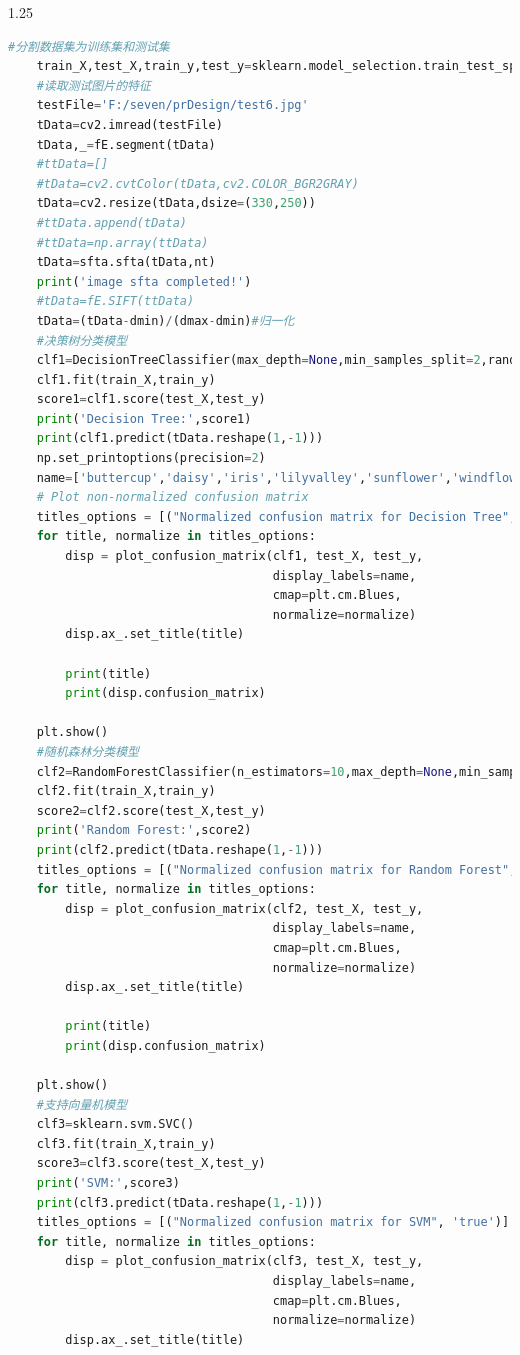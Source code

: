\documentclass[supercite]{HustGraduPaper}
\begin{document}
\begin{sloppypar}
\begin{appendices}
\begin{spacing}{1.25}
\begin{lstlisting}[language=python]
    #分割数据集为训练集和测试集
    train_X,test_X,train_y,test_y=sklearn.model_selection.train_test_split(data,label,test_size=0.5,random_state=42,stratify=label)
    #读取测试图片的特征
    testFile='F:/seven/prDesign/test6.jpg'
    tData=cv2.imread(testFile)
    tData,_=fE.segment(tData)
    #ttData=[]
    #tData=cv2.cvtColor(tData,cv2.COLOR_BGR2GRAY)
    tData=cv2.resize(tData,dsize=(330,250))
    #ttData.append(tData)
    #ttData=np.array(ttData)
    tData=sfta.sfta(tData,nt)
    print('image sfta completed!')
    #tData=fE.SIFT(ttData)
    tData=(tData-dmin)/(dmax-dmin)#归一化
    #决策树分类模型
    clf1=DecisionTreeClassifier(max_depth=None,min_samples_split=2,random_state=0)
    clf1.fit(train_X,train_y)
    score1=clf1.score(test_X,test_y)
    print('Decision Tree:',score1)
    print(clf1.predict(tData.reshape(1,-1)))
    np.set_printoptions(precision=2)
    name=['buttercup','daisy','iris','lilyvalley','sunflower','windflower']
    # Plot non-normalized confusion matrix
    titles_options = [("Normalized confusion matrix for Decision Tree", 'true')]
    for title, normalize in titles_options:
        disp = plot_confusion_matrix(clf1, test_X, test_y,
                                     display_labels=name,
                                     cmap=plt.cm.Blues,
                                     normalize=normalize)
        disp.ax_.set_title(title)
    
        print(title)
        print(disp.confusion_matrix)
    
    plt.show()
    #随机森林分类模型
    clf2=RandomForestClassifier(n_estimators=10,max_depth=None,min_samples_split=2,random_state=0)
    clf2.fit(train_X,train_y)
    score2=clf2.score(test_X,test_y)
    print('Random Forest:',score2)
    print(clf2.predict(tData.reshape(1,-1)))
    titles_options = [("Normalized confusion matrix for Random Forest", 'true')]
    for title, normalize in titles_options:
        disp = plot_confusion_matrix(clf2, test_X, test_y,
                                     display_labels=name,
                                     cmap=plt.cm.Blues,
                                     normalize=normalize)
        disp.ax_.set_title(title)
    
        print(title)
        print(disp.confusion_matrix)
    
    plt.show()
    #支持向量机模型
    clf3=sklearn.svm.SVC()
    clf3.fit(train_X,train_y)
    score3=clf3.score(test_X,test_y)
    print('SVM:',score3)
    print(clf3.predict(tData.reshape(1,-1)))
    titles_options = [("Normalized confusion matrix for SVM", 'true')]
    for title, normalize in titles_options:
        disp = plot_confusion_matrix(clf3, test_X, test_y,
                                     display_labels=name,
                                     cmap=plt.cm.Blues,
                                     normalize=normalize)
        disp.ax_.set_title(title)
    

\end{lstlisting}
\end{spacing}
\end{appendices}
\end{sloppypar}
\end{document}
